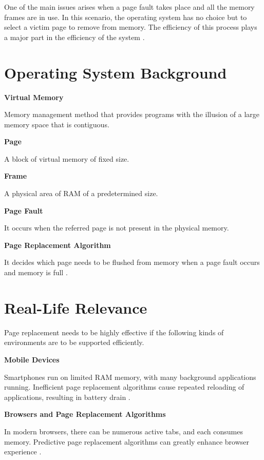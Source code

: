 \documentclass[conference]{IEEEtran}
\begin{document}
One of the main issues arises when a page fault takes place and all the memory frames are in use. In this scenario, the operating system has no choice but to select a victim page to remove from memory. The efficiency of this process plays a major part in the efficiency of the system \cite{silberschatz2018operating}.
\vspace{0.7\baselineskip}


\section{\textbf{Operating System Background}}

\textbf{Virtual Memory}

Memory management method that provides programs with the illusion of a large memory space that is contiguous.

\textbf{Page}

A block of virtual memory of fixed size.

\textbf{Frame}

A physical area of RAM of a predetermined size.

\textbf{Page Fault}

It occurs when the referred page is not present in the physical memory.

\textbf{Page Replacement Algorithm}

It decides which page needs to be flushed from memory when a page fault occurs and memory is full \cite{silberschatz2018operating,tanenbaum2015modern}.

\section{\textbf{Real-Life Relevance}}

Page replacement needs to be highly effective if the following kinds of environments are to be supported efficiently.

\textbf{Mobile Devices}

Smartphones run on limited RAM memory, with many background applications running. Inefficient page replacement algorithms cause repeated reloading of applications, resulting in battery drain \cite{jiang2005making,levinthal1992performance}.

\textbf{Browsers and Page Replacement Algorithms}

In modern browsers, there can be numerous active tabs, and each consumes memory. Predictive page replacement algorithms can greatly enhance browser experience \cite{lee2017machine,jain2016online}.
\end{document}

